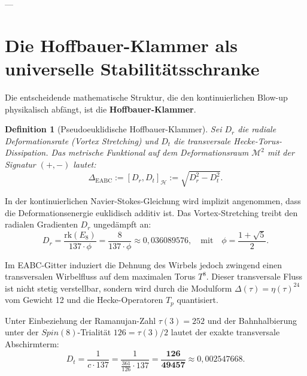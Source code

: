 \documentclass[11pt,a4paper]{article}
\newtheorem{definition}[theorem]{Definition}
\begin{document}
---

\section{Die Hoffbauer-Klammer als universelle Stabilitätsschranke}

Die entscheidende mathematische Struktur, die den kontinuierlichen Blow-up physikalisch abfängt, ist die \textbf{Hoffbauer-Klammer}. 

\begin{definition}[Pseudoeuklidische Hoffbauer-Klammer]
Sei $D_r$ die radiale Deformationsrate (Vortex Stretching) und $D_t$ die transversale Hecke-Torus-Dissipation. Das metrische Funktional auf dem Deformationsraum $\mathcal{M}^2$ mit der Signatur $(+,-)$ lautet:
\begin{equation}
\Delta_{\mathrm{EABC}} := [D_r, D_t]_{\mathcal{H}} := \sqrt{D_r^2 - D_t^2}.
\end{equation}
\end{definition}

In der kontinuierlichen Navier-Stokes-Gleichung wird implizit angenommen, dass die Deformationsenergie euklidisch additiv ist. Das Vortex-Stretching treibt den radialen Gradienten $D_r$ ungedämpft an:
\begin{equation}
D_r = \frac{\mathrm{rk}(E_8)}{137 \cdot \phi} = \frac{8}{137 \cdot \phi} \approx 0{,}036089576, \quad \text{mit} \quad \phi = \frac{1+\sqrt{5}}{2}.
\end{equation}

Im EABC-Gitter induziert die Dehnung des Wirbels jedoch zwingend einen transversalen Wirbelfluss auf dem maximalen Torus $T^8$. Dieser transversale Fluss ist nicht stetig verstellbar, sondern wird durch die Modulform $\Delta(\tau) = \eta(\tau)^{24}$ vom Gewicht 12 und die Hecke-Operatoren $T_p$ quantisiert.

Unter Einbeziehung der Ramanujan-Zahl $\tau(3) = 252$ und der Bahnhalbierung unter der $Spin(8)$-Trialität $126 = \tau(3)/2$ lautet der exakte transversale Abschirmterm:
\begin{equation}
D_t = \frac{1}{c \cdot 137} = \frac{1}{\frac{361}{126} \cdot 137} = \frac{\mathbf{126}}{\mathbf{49457}} \approx 0{,}002547668.
\end{equation}
\end{document}
